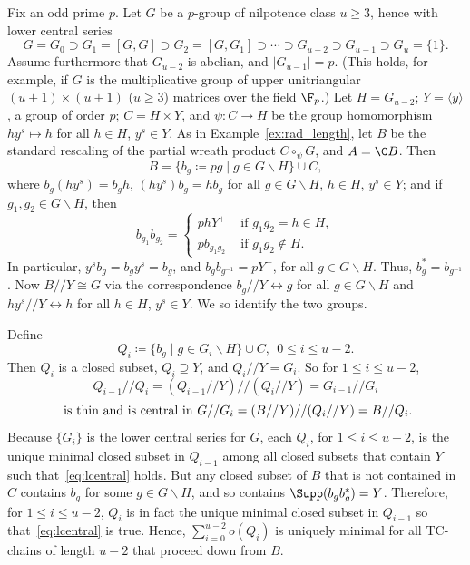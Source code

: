 \begin{exam}
\label{ex:lower}
Fix an odd prime $p$. Let $G$ be a $p$-group of nilpotence class $u
\geq 3$, hence with lower central series
\[
G = G_0 \supset G_1 = [G,G] \supset G_2 = [G, G_1] \supset \cdots
\supset G_{u-2} \supset G_{u-1} \supset G_u = \{1\}.
\]
Assume furthermore that $G_{u-2}$ is abelian, and $|G_{u-1}| = p$.
(This holds, for example, if $G$ is the multiplicative group of upper
unitriangular $(u+1)\times(u+1)$ ($u \geq 3$) matrices over the field
${\F}_p$.) Let $H = G_{u-2}$; $Y = \langle y \rangle$, a group of order
$p$; $C = H\times Y$, and $\psi: C \rightarrow H$ be the group
homomorphism $hy^s \mapsto h$ for all $h \in H$, $y^s \in Y$. As in
Example~\ref{ex:rad_length}, let $B$ be the standard rescaling of the
partial wreath product $C \circ_{\psi} G$, and $A = {\C}B$. Then
\[
B = \{b_g \coloneqq pg \mid g \in G\backslash H\} \cup C,
\]
where $b_g(hy^s) = b_gh$, $(hy^s)b_g = hb_g$ for all $g \in G\backslash
H$, $h \in H$, $y^s \in Y$; and if $g_1, g_2 \in G\backslash H$, then
\[
b_{g_1}b_{g_2} 
= \begin{cases}
phY^+ & \mbox{ if }g_1g_2 = h \in H,\\
pb_{g_1g_2} & \mbox{ if }g_1g_2 \notin H. 
\end{cases}
\] 
In particular, $y^sb_g = b_gy^s = b_g$, and $b_gb_{g^{-1}} = pY^+$, for
all $g \in G\backslash H$. Thus, $b_g^* = b_{g^{-1}}$. Now $B//Y \cong
G$ via the correspondence $b_g//Y \leftrightarrow g$ for all $g \in
G\backslash H$ and $hy^s//Y \leftrightarrow h$ for all $h \in H$, $y^s
\in Y$. We so identify the two groups.

Define 
\[
Q_i \coloneqq \{b_g \mid g \in G_i\backslash H\} \cup C, \ \ 0 \leq i \leq
u-2.
\]
Then $Q_i$ is a closed subset, $Q_i \supseteq Y$, and $Q_i//Y = G_i$.
So for $1 \leq i \leq u-2$,
\[
Q_{i-1}//Q_i = (Q_{i-1}//Y)//(Q_i//Y) =
G_{i-1}//G_i
\]
\begin{equation}
\label{eq:lcentral}
 \mbox{ is thin and is central in } \\ G//G_i = (B//Y)//(Q_i//Y)
= B//Q_i. 
\end{equation}
Because $\{G_i\}$ is the lower central series for $G$, each $Q_i$, for
$1 \leq i \leq u-2$, is the unique minimal closed subset in $Q_{i-1}$ 
among all closed subsets that contain $Y$ such that~\eqref{eq:lcentral}
holds. But any closed subset of $B$ that is not contained in $C$
contains $b_g$ for some $g \in G\backslash H$, and so contains
$\Supp(b_gb_g^*) = Y$. Therefore, for $1 \leq i \leq u-2$, $Q_i$
is in fact the unique minimal closed subset in $Q_{i-1}$ so that~\eqref{eq:lcentral} is true. Hence, $\sum_{i=0}^{u-2}o(Q_i)$ is
uniquely minimal
for all TC-chains of length $u-2$ that proceed down from $B$. 


\end{exam}
